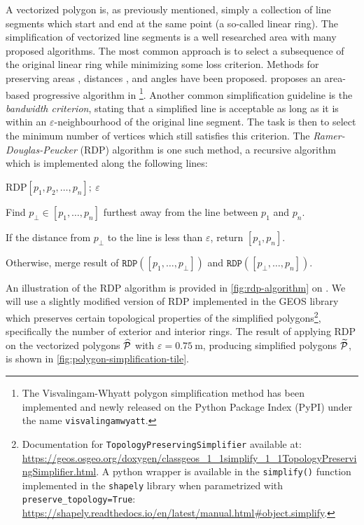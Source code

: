 A vectorized polygon is, as previously mentioned, simply a collection of line segments which start and end at the same point (a so-called linear ring).
The simplification of vectorized line segments is a well researched area with many proposed algorithms.
The most common approach is to select a subsequence of the original linear ring while minimizing some loss criterion.
Methods for preserving areas \cite{ls-area-preserving}, distances \cite{ls-distance-preserving}, and angles \cite{ls-angle-preserving} have been proposed.
\citeauthor{ls-vw} proposes an area-based progressive algorithm in \cite{ls-vw}\footnote{The Visvalingam-Whyatt polygon simplification method has been implemented and newly released on the Python Package Index (PyPI) under the name \texttt{visvalingamwyatt}.}.
Another common simplification guideline is the \textit{bandwidth criterion}, stating that a simplified line is acceptable as long as it is within an $\varepsilon$-neighbourhood of the original line segment.
The task is then to select the minimum number of vertices which still satisfies this criterion.
The \textit{Ramer-Douglas-Peucker} (RDP) algorithm\cite{ls-rdp} is one such method, a recursive algorithm which is implemented along the following lines:
\begin{pseudofunc}{RDP}{$[p_1, p_2, \ldots, p_n];~\varepsilon$}
  \item Find $p_{\perp} \in [p_1, \ldots, p_n]$ furthest away from the line between $p_1$ and $p_n$.
  \item If the distance from $p_{\perp}$ to the line is less than $\varepsilon$, return $[p_1, p_n]$.
  \item Otherwise, merge result of $\texttt{RDP}([p_1, \ldots, p_{\perp}])$ and $\texttt{RDP}([p_{\perp}, \ldots, p_n])$.
\end{pseudofunc}
An illustration of the RDP algorithm is provided in \cref{fig:rdp-algorithm} on .
We will use a slightly modified version of RDP implemented in the GEOS library which preserves certain topological properties of the simplified polygons\footnote{Documentation for \texttt{TopologyPreservingSimplifier} available at: \url{https://geos.osgeo.org/doxygen/classgeos_1_1simplify_1_1TopologyPreservingSimplifier.html}. A python wrapper is available in the \texttt{simplify()} function implemented in the \texttt{shapely} library when parametrized with \texttt{preserve\_topology=True}: \url{https://shapely.readthedocs.io/en/latest/manual.html\#object.simplify}.}, specifically the number of exterior and interior rings.
The result of applying RDP on the vectorized polygons $\widehat{\mathcal{P}}$ with $\varepsilon = \SI{0.75}{\meter}$, producing simplified polygons $\widetilde{\mathcal{P}}$, is shown in \cref{fig:polygon-simplification-tile}.
